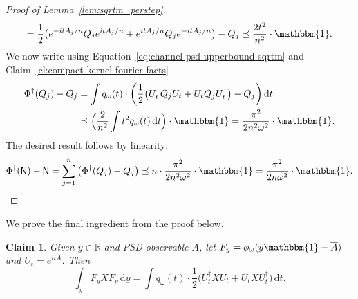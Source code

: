\documentclass[10pt]{article}
\newcommand{\luders}{\Phi}
\newcommand{\Id}{\mathbbm{1}}
\newtheorem{claim}[theorem]{Claim}
\newcommand{\lift}[1]{\overline{#1}}
\begin{document}
\begin{proof}[Proof of Lemma~\ref{lem:sqrtm_perstep}]
\begin{equation}
        = \frac{1}{2} \big(e^{-itA_j/n} Q_j e^{itA_j/n} + e^{itA_j/n} Q_j e^{-itA_j/n}\big) - Q_j
        \preceq \frac{2t^2}{n^2} \cdot \Id.
        \label{eq:channel-psd-upperbound-sqrtm}
    \end{equation}
    We now write using Equation~\eqref{eq:channel-psd-upperbound-sqrtm} and Claim~\ref{cl:compact-kernel-fourier-facts}
    \begin{align*}
        \luders^{\dagger}(Q_j) - Q_j
        &= \int q_\omega(t) \cdot \bigg(\frac{1}{2} \big(U_t^{\dagger} Q_j U_t + U_t Q_j U_t^{\dagger}\big) - Q_j\bigg)\,\mathrm{d}t \\
        &\preceq \Big(\frac{2}{n^2}\int t^2 q_\omega(t) \,\mathrm{d}t\Big) \cdot \Id
        = \frac{\pi^2}{2n^2\omega^2} \cdot \Id.
    \end{align*}
    The desired result follows by linearity:
    \begin{equation*}
        \luders^{\dagger}(\mathsf{N}) - \mathsf{N}
        = \sum_{j=1}^n \big(\luders^{\dagger}(Q_j) - Q_j\big)
        \preceq n \cdot \frac{\pi^2}{2n^2\omega^2} \cdot \Id = \frac{\pi^2}{2n\omega^2} \cdot \Id. \qedhere
    \end{equation*}
\end{proof}
We prove the final ingredient from the proof below.
\begin{claim}
    \label{cl:sqrtm-channel-as-time-evolution}
    Given $y\in\mathbb{R}$ and PSD observable $A$, let $F_y = \phi_{\omega}(y\Id - \lift{A})$ and $U_t = e^{it\lift{A}}$. Then
    \begin{equation}
        \int_y F_y X F_y\,\mathrm{d}y
        = \int q_\omega(t) \cdot \frac{1}{2} \big(U_t^{\dagger} X U_t + U_t X U_t^{\dagger}\big)\,\mathrm{d}t.
    \end{equation}
\end{claim}
\end{document}
